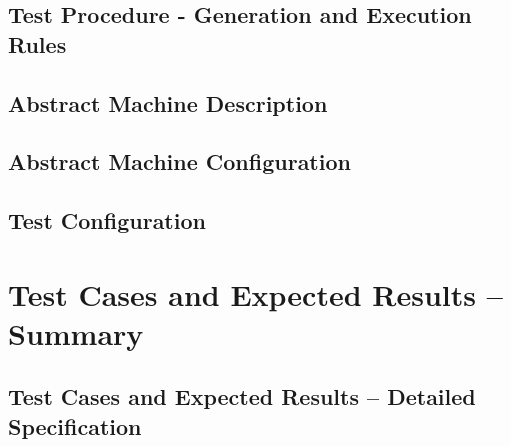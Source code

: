 \documentclass[pdftex,12pt]{report}
\begin{document}
\begin{fullpage}
\chapter{Test Procedure - Generation and Execution Rules}

\section{Abstract Machine Description}


\section{Abstract Machine Configuration}


\newpage
\section{Test Configuration}
\footnotesize

\normalsize
\end{fullpage}

\chapter{Test Cases and Expected Results -- Summary}



\begin{fullpage}
\chapter{Test Cases and Expected Results -- Detailed Specification}

\end{fullpage}

\end{document}
